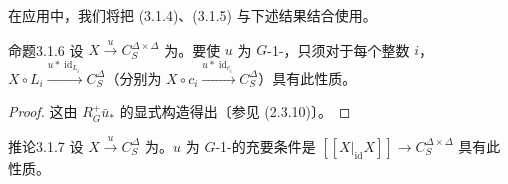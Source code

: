 在应用中，我们将把 (3.1.4)、(3.1.5) 与下述结果结合使用。
\begin{SGAresult}{命题}{3.1.6}
设 $X\xrightarrow{u}C_S^{\Delta\times\Delta}$ 为。要使 $u$ 为 $G$-1-，只须对于每个整数 $i$，$X\circ L_i\xrightarrow{u*\operatorname{id}_{L_i}}C_S^\Delta$（分别为 $X\circ c_i\xrightarrow{u*\operatorname{id}_{c_i}}C_S^\Delta$）具有此性质。
\end{SGAresult}
\begin{proof}
这由 $R_G^+\bar u_*$ 的显式构造得出〔参见 (2.3.10)〕。
\end{proof}
\begin{SGAresult}{推论}{3.1.7}
设 $X\xrightarrow{u}C_S^\Delta$ 为。$u$ 为 $G$-1-的充要条件是 $[[X|_{\mathrm{id}}X]]\to C_S^{\Delta\times\Delta}$ 具有此性质。
\end{SGAresult}

